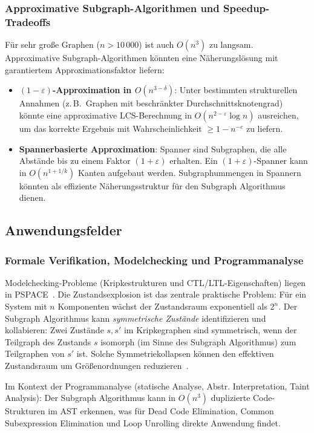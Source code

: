 ﻿\documentclass[a4paper,12pt]{article}
\theoremstyle{definition}
\begin{document}
\subsubsection{Approximative Subgraph-Algorithmen und Speedup-Tradeoffs}

Für sehr große Graphen ($n > 10\,000$) ist auch $O(n^3)$ zu langsam.
Approximative Subgraph-Algorithmen könnten eine Näherungslösung mit
garantiertem Approximationsfaktor liefern:
\begin{itemize}
  \item \textbf{$(1-\varepsilon)$-Approximation in $O(n^{3-\delta})$}:
        Unter bestimmten strukturellen Annahmen (z.\,B.\ Graphen mit beschränkter
        Durchschnittsknotengrad) könnte eine approximative LCS-Berechnung
        in $O(n^{2-\varepsilon} \log n)$ ausreichen, um das korrekte Ergebnis
        mit Wahrscheinlichkeit $\geq 1 - n^{-c}$ zu liefern.
  \item \textbf{Spannerbasierte Approximation}: Spanner sind Subgraphen, die alle
        Abstände bis zu einem Faktor $(1+\varepsilon)$ erhalten.
        Ein $(1+\varepsilon)$-Spanner kann in $O(n^{1+1/k})$ Kanten aufgebaut werden.
        Subgraphummengen in Spannern könnten als effiziente Näherungsstruktur
        für den Subgraph Algorithmus dienen.
\end{itemize}

\subsection{Anwendungsfelder}

\subsubsection{Formale Verifikation, Modelchecking und Programmanalyse}

Modelchecking-Probleme (Kripkestrukturen und CTL/LTL-Eigenschaften) liegen
in PSPACE~\cite{clarke1999model}. Die Zustandsexplosion ist das zentrale
praktische Problem: Für ein System mit $n$ Komponenten wächst der Zustandsraum
exponentiell als $2^n$.
Der Subgraph Algorithmus kann \emph{symmetrische Zustände} identifizieren
und kollabieren: Zwei Zustände $s, s'$ im Kripkegraphen sind symmetrisch,
wenn der Teilgraph des Zustands $s$ isomorph (im Sinne des Subgraph Algorithmus)
zum Teilgraphen von $s'$ ist.
Solche Symmetriekollapsen können den effektiven Zustandsraum um Größenordnungen
reduzieren~\cite{clarke1999model}.

Im Kontext der Programmanalyse (statische Analyse, Abstr. Interpretation, Taint Analysis):
Der Subgraph Algorithmus kann in $O(n^3)$ duplizierte Code-Strukturen im AST erkennen,
was für Dead Code Elimination, Common Subexpression Elimination und Loop Unrolling
direkte Anwendung findet.
\end{document}

